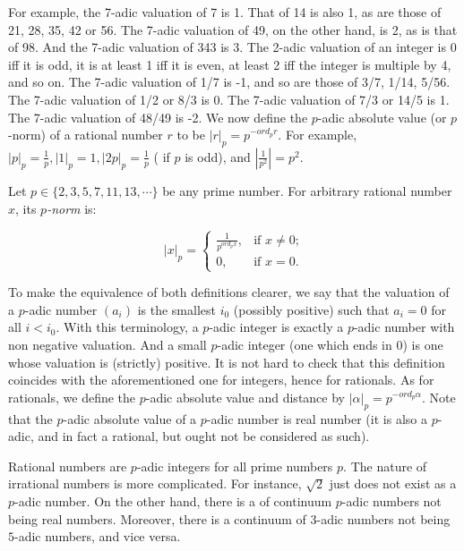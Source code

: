 \documentclass{llncs}
\begin{document}
For example, the 7-adic valuation of 7 is 1. That of 14 is also 1, as are those of
21, 28, 35, 42 or 56. The 7-adic valuation of 49, on the other hand, is 2, as is that
of 98. And the 7-adic valuation of 343 is 3. The 2-adic valuation of an integer is
0 iff it is odd, it is at least 1 iff it is even, at least 2 iff the integer is multiple by 4,
and so on. The 7-adic valuation of 1/7 is -1, and so are those of 3/7, 1/14, 5/56.
The 7-adic valuation of 1/2 or 8/3 is 0. The 7-adic valuation of 7/3 or 14/5 is 1.
The 7-adic valuation of 48/49 is -2.
We now define the $p$-adic absolute value (or $p$-norm) of a rational number $r$ to be 
$|r|_p = p^{-ord_p r}$. For example, $|p|_p = \frac{1}{p} , |1|_p = 1, |2p|_p = \frac{1}{p}$
( if $p$ is odd), and $|\frac{1}{p^2}| = p^2$.

\begin{definition}
Let $p \in \{2,3,5,7,11,13,\cdots \}$ be any prime number. For arbitrary rational number $x$, its {\em $p$-norm} is:

$$|x|_p = \begin{cases}
            \frac{1}{p^{ord_p x}}, &  \text{if $x \neq 0$;}\\
            0, & \text{if $x = 0$.}
            \end{cases}
$$

\end{definition} 
 
To make the equivalence of both definitions clearer, we say that the valuation
of a $p$-adic number $(a_i)$ is the smallest $i_0$ (possibly positive) such that $a_i = 0$ for
all $i < i_0$. With this terminology, a $p$-adic integer is exactly a $p$-adic number with
non negative valuation. And a small $p$-adic integer (one which ends in 0) is one
whose valuation is (strictly) positive. It is not hard to check that this definition
coincides with the aforementioned one for integers, hence for rationals.
As for rationals, we define the $p$-adic absolute value and distance by $|\alpha |_p =
p^{- ord_p \alpha }$. Note that the $p$-adic absolute value of a $p$-adic number is real number (it
is also a $p$-adic, and in fact a rational, but ought not be considered as such).            

Rational numbers are $p$-adic integers for all prime numbers $p$. The nature of irrational numbers is more complicated. For instance, $\sqrt{2}$ just does not exist as a $p$-adic number. On the other hand, there is a of continuum  $p$-adic numbers not being real numbers. Moreover, there is a continuum of $3$-adic numbers not being $5$-adic numbers, and vice versa.
 
\end{document}

